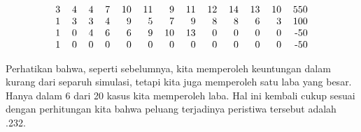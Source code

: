 \begin{example}
\begin{table}
$$\begin{tabular}{rrrrrrrrrrrrr}
3   &4   &4   &7  &10  &11  & 9   &11  &12  &14  &13  &10  & 550\\ 
1   &3   &3   &4  & 9  & 5  & 7   &9   &8   &8   &6   &3   & 100\\ 
1   &0   &4   &6  & 6  & 9  &10   &13  &0   &0   &0   &0   & -50\\ 
1   &0   &0   &0  & 0  & 0  & 0   &0   &0   &0   &0   &0   & -50\\ 
\end{tabular}
$$
\caption{Simulasi surat berantai (kasus Poisson).}
\label{table 10.5}
\end{table}
\par
Perhatikan bahwa, seperti sebelumnya, kita memperoleh keuntungan dalam kurang dari separuh simulasi, tetapi
kita juga memperoleh satu laba yang besar.  Hanya dalam 6 dari 20 kasus kita memperoleh laba.
Hal ini kembali cukup sesuai dengan perhitungan kita bahwa peluang terjadinya
peristiwa tersebut adalah .232.
\end{example}

